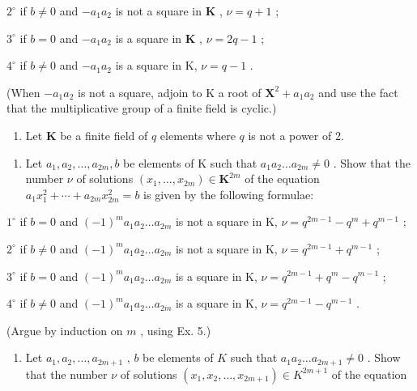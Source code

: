 \(2^{\circ}\) if \(b \neq 0\) and \(-a_{1}a_{2}\) is not a square in \(\mathbf{K}\) , \(\nu = q + 1\) ;

\(3^{\circ}\) if \(b = 0\) and \(-a_{1}a_{2}\) is a square in \(\mathbf{K}\) , \(\nu = 2q - 1\) ;

\(4^{\circ}\) if \(b \neq 0\) and \(-a_{1}a_{2}\) is a square in K, \(\nu = q - 1\) .

(When \(-a_{1}a_{2}\) is not a square, adjoin to K a root of \(\mathbf{X}^{2} + a_{1}a_{2}\) and use the fact that the multiplicative group of a finite field is cyclic.)

\begin{enumerate}
\def\labelenumi{\arabic{enumi})}
\setcounter{enumi}{5}
\tightlist
\item
  Let \(\mathbf{K}\) be a finite field of \(q\) elements where \(q\) is not a power of 2.
\end{enumerate}

\begin{enumerate}
\def\labelenumi{\alph{enumi})}
\tightlist
\item
  Let \(a_{1}, a_{2}, \ldots, a_{2m}, b\) be elements of K such that \(a_{1}a_{2} \ldots a_{2m} \neq 0\) . Show that the number \(\nu\) of solutions \((x_{1}, \ldots, x_{2m}) \in \mathbf{K}^{2m}\) of the equation \(a_{1}x_{1}^{2} + \cdots + a_{2m}x_{2m}^{2} = b\) is given by the following formulae:
\end{enumerate}

\(1^{\circ}\) if \(b = 0\) and \((-1)^{m}a_{1}a_{2}\ldots a_{2m}\) is not a square in K, \(\nu = q^{2m - 1} - q^{m} + q^{m - 1}\) ;

\(2^{\circ}\) if \(b \neq 0\) and \((-1)^{m}a_{1}a_{2} \ldots a_{2m}\) is not a square in K, \(\nu = q^{2m-1} + q^{m-1}\) ;

\(3^{\circ}\) if \(b = 0\) and \((-1)^{m}a_{1}a_{2}\ldots a_{2m}\) is a square in K, \(\nu = q^{2m - 1} + q^{m} - q^{m - 1}\) ;

\(4^{\circ}\) if \(b \neq 0\) and \((-1)^{m}a_{1}a_{2} \ldots a_{2m}\) is a square in K, \(\nu = q^{2m - 1} - q^{m - 1}\) .

(Argue by induction on \(m\) , using Ex. 5.)

\begin{enumerate}
\def\labelenumi{\alph{enumi})}
\setcounter{enumi}{1}
\tightlist
\item
  Let \(a_1, a_2, \ldots, a_{2m+1}\) , \(b\) be elements of \(K\) such that \(a_1a_2 \ldots a_{2m+1} \neq 0\) . Show that the number \(\nu\) of solutions \((x_1, x_2, \ldots, x_{2m+1}) \in K^{2m+1}\) of the equation
\end{enumerate}

